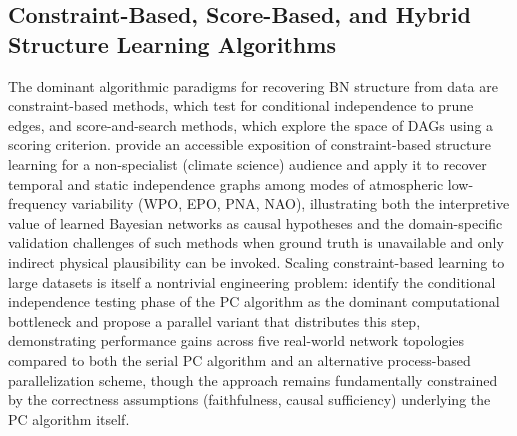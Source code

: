 \subsection{Constraint-Based, Score-Based, and Hybrid Structure Learning Algorithms}
The dominant algorithmic paradigms for recovering BN structure from data are constraint-based methods, which test for conditional independence to prune edges, and score-and-search methods, which explore the space of DAGs using a scoring criterion. \cite{ebertuphoff2012causal} provide an accessible exposition of constraint-based structure learning for a non-specialist (climate science) audience and apply it to recover temporal and static independence graphs among modes of atmospheric low-frequency variability (WPO, EPO, PNA, NAO), illustrating both the interpretive value of learned Bayesian networks as causal hypotheses and the domain-specific validation challenges of such methods when ground truth is unavailable and only indirect physical plausibility can be invoked. Scaling constraint-based learning to large datasets is itself a nontrivial engineering problem: \cite{madsen2016parallel} identify the conditional independence testing phase of the PC algorithm as the dominant computational bottleneck and propose a parallel variant that distributes this step, demonstrating performance gains across five real-world network topologies compared to both the serial PC algorithm and an alternative process-based parallelization scheme, though the approach remains fundamentally constrained by the correctness assumptions (faithfulness, causal sufficiency) underlying the PC algorithm itself.

